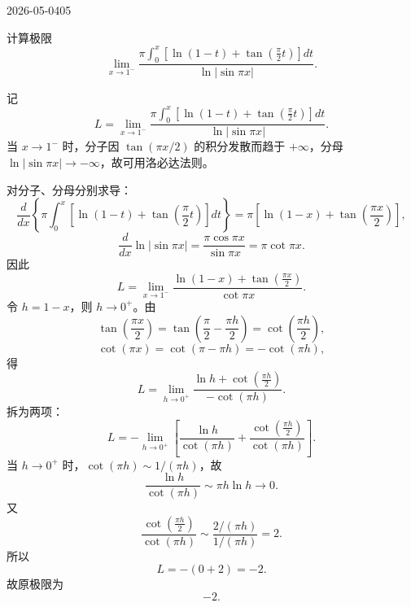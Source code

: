 \begin{mistake}{2026-05-04}{05}

\begin{problemcontent}
计算极限
\[
\lim_{x\to 1^-}\frac{\pi\displaystyle\int_0^x\left[\ln(1-t)+\tan\left(\frac{\pi}{2}t\right)\right]dt}{\ln|\sin \pi x|}.
\]
\end{problemcontent}

\begin{solutioncontent}
记
\[
L=\lim_{x\to 1^-}\frac{\pi\displaystyle\int_0^x\left[\ln(1-t)+\tan\left(\frac{\pi}{2}t\right)\right]dt}{\ln|\sin \pi x|}.
\]
当 \(x\to 1^-\) 时，分子因 \(\tan(\pi x/2)\) 的积分发散而趋于 \(+\infty\)，分母 \(\ln|\sin\pi x|\to -\infty\)，故可用洛必达法则。

对分子、分母分别求导：
\[
\frac{d}{dx}\left\{\pi\int_0^x\left[\ln(1-t)+\tan\left(\frac{\pi}{2}t\right)\right]dt\right\}
=\pi\left[\ln(1-x)+\tan\left(\frac{\pi x}{2}\right)\right],
\]
\[
\frac{d}{dx}\ln|\sin\pi x|=\frac{\pi\cos\pi x}{\sin\pi x}=\pi\cot\pi x.
\]
因此
\[
L=\lim_{x\to1^-}\frac{\ln(1-x)+\tan\left(\frac{\pi x}{2}\right)}{\cot\pi x}.
\]
令 \(h=1-x\)，则 \(h\to0^+\)。由
\[
\tan\left(\frac{\pi x}{2}\right)=\tan\left(\frac{\pi}{2}-\frac{\pi h}{2}\right)=\cot\left(\frac{\pi h}{2}\right),
\]
\[
\cot(\pi x)=\cot(\pi-\pi h)=-\cot(\pi h),
\]
得
\[
L=\lim_{h\to0^+}\frac{\ln h+\cot\left(\frac{\pi h}{2}\right)}{-\cot(\pi h)}.
\]
拆为两项：
\[
L=-\lim_{h\to0^+}\left[\frac{\ln h}{\cot(\pi h)}+\frac{\cot\left(\frac{\pi h}{2}\right)}{\cot(\pi h)}\right].
\]
当 \(h\to0^+\) 时，\(\cot(\pi h)\sim 1/(\pi h)\)，故
\[
\frac{\ln h}{\cot(\pi h)}\sim \pi h\ln h\to0.
\]
又
\[
\frac{\cot\left(\frac{\pi h}{2}\right)}{\cot(\pi h)}
\sim
\frac{2/(\pi h)}{1/(\pi h)}=2.
\]
所以
\[
L=-(0+2)=-2.
\]
故原极限为
\[
\boxed{-2}.
\]
\end{solutioncontent}


\end{mistake}
